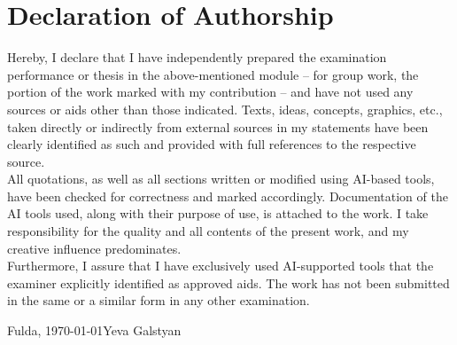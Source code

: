 \newpage
\thispagestyle{empty}
\section*{Declaration of Authorship}

Hereby, I declare that I have independently prepared the examination performance or thesis in the above-mentioned module – for group work, the portion of the work marked with my contribution – and have not used any sources or aids other than those indicated. Texts, ideas, concepts, graphics, etc., taken directly or indirectly from external sources in my statements have been clearly identified as such and provided with full references to the respective
source. \\

All quotations, as well as all sections written or modified using AI-based tools, have been checked for correctness and marked accordingly. Documentation of the AI tools used, along with their purpose of use, is attached to the work. I take responsibility for the quality and all contents of the present work, and my creative influence predominates.\\

Furthermore, I assure that I have exclusively used AI-supported tools that the examiner explicitly identified as approved aids. The work has not been submitted in the same or a similar form in any other examination.

\vspace{4\baselineskip}

\noindent Fulda, \today \hfill Yeva Galstyan

\vspace{4\baselineskip}